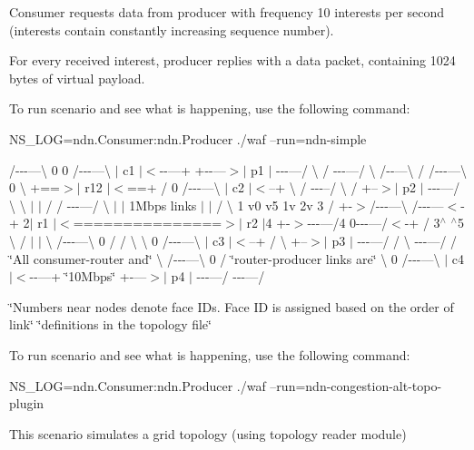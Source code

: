 Consumer requests data from producer with frequency 10 interests per second (interests contain constantly increasing sequence number).

For every received interest, producer replies with a data packet, containing 1024 bytes of virtual payload.

To run scenario and see what is happening, use the following command\+: \begin{DoxyVerb}NS_LOG=ndn.Consumer:ndn.Producer ./waf --run=ndn-simple\end{DoxyVerb}


/-\/-\/-\/---\textbackslash{} 0 0 /-\/-\/-\/---\textbackslash{} $\vert$ c1 $\vert$$<$-\/-\/---+ +-\/-\/---$>$$\vert$ p1 $\vert$ -\/-\/-\/---/ \textbackslash{} / -\/-\/-\/---/ \textbackslash{} /-\/-\/---\textbackslash{} / /-\/-\/-\/---\textbackslash{} 0 \textbackslash{} +==$>$$\vert$ r12 $\vert$$<$==+ / 0 /-\/-\/-\/---\textbackslash{} $\vert$ c2 $\vert$$<$--+ \textbackslash{} / -\/-\/-\/--/ \textbackslash{} / +--$>$$\vert$ p2 $\vert$ -\/-\/-\/---/ \textbackslash{} \textbackslash{} $\vert$ $\vert$ / / -\/-\/-\/---/ \textbackslash{} $\vert$ $\vert$ 1\+Mbps links $\vert$ $\vert$ / \textbackslash{} 1 v0 v5 1v 2v 3 / +-\/$>$/-\/-\/-\/---\textbackslash{} /-\/-\/-\/---$<$-\/+ 2$\vert$ r1 $\vert$$<$===============$>$$\vert$ r2 $\vert$4 +-\/$>$-\/-\/-\/---/4 0-\/-\/-\/---/$<$-\/+ / 3$^\wedge$ $^\wedge$5 \textbackslash{} / $\vert$ $\vert$ \textbackslash{} /-\/-\/-\/---\textbackslash{} 0 / / \textbackslash{} \textbackslash{} 0 /-\/-\/-\/---\textbackslash{} $\vert$ c3 $\vert$$<$--+ / \textbackslash{} +--$>$$\vert$ p3 $\vert$ -\/-\/-\/---/ / \textbackslash{} -\/-\/-\/---/ / \char`\"{}\+All consumer-\/router and\char`\"{} \textbackslash{} /-\/-\/-\/---\textbackslash{} 0 / \char`\"{}router-\/producer links are\char`\"{} \textbackslash{} 0 /-\/-\/-\/---\textbackslash{} $\vert$ c4 $\vert$$<$-\/-\/---+ \char`\"{}10\+Mbps\char`\"{} +-\/---$>$$\vert$ p4 $\vert$ -\/-\/-\/---/ -\/-\/-\/---/

\char`\"{}\+Numbers near nodes denote face I\+Ds. Face I\+D is assigned based on the order of link\char`\"{} \char`\"{}definitions in the topology file\char`\"{}

To run scenario and see what is happening, use the following command\+: \begin{DoxyVerb}NS_LOG=ndn.Consumer:ndn.Producer ./waf --run=ndn-congestion-alt-topo-plugin\end{DoxyVerb}


This scenario simulates a grid topology (using topology reader module)

